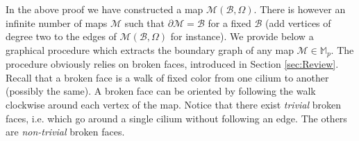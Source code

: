 \documentclass[aps,prd,10pt,notitlepage,nofootinbib,superscriptaddress,showkeys,showpacs]{revtex4-1}
\begin{document}
In the above proof we have constructed a map ${\mathcal{M}}({\mathcal{B}}, \Omega)$. There is however an infinite number of maps ${\mathcal{M}}$ such that $\partial {\mathcal{M}} = {\mathcal{B}}$ for a fixed ${\mathcal{B}}$ (add vertices of degree two to the edges of ${\mathcal{M}}({\mathcal{B}}, \Omega)$ for instance). We provide below a graphical procedure which extracts the boundary graph of any map ${\mathcal{M}}\in{\mathbb{M}}_p$. The procedure obviously relies on broken faces, introduced in Section \ref{sec:Review}. Recall that a broken face is a walk of fixed color from one cilium to another (possibly the same). A broken face can be oriented by following the walk clockwise around each vertex of the map. Notice that there exist \emph{trivial} broken faces, i.e. which go around a single cilium without following an edge. The others are \emph{non-trivial} broken faces.
\end{document}

